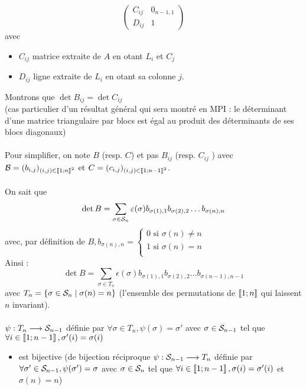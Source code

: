 \begin{dem}
\[\begin{pmatrix}
        C_{ij} & 0_{n-1,1} \\
        D_{ij} & 1         
    \end{pmatrix}\]
    avec
    \begin{itemize}
        \item \(C_{ij}\) matrice extraite de \(A\) en otant \(L_i\) et \(C_j\)
        \item \(D_{ij}\) ligne extraite de \(L_i\) en otant sa colonne \(j\).
    \end{itemize}
    Montrons que \(\det B_{ij} = \det C_{ij}\)\\
    (cas particulier d’un résultat général qui sera montré en MPI : le déterminant d’une matrice triangulaire par blocs est égal au produit des déterminants de ses blocs diagonaux)\\~\\
    Pour simplifier, on note \(B\) (resp. \(C\)) et pas \(B_{ij}\) (resp. \(C_{ij}\) ) avec \(\cal{B} = (b_{i,j} )_{(i,j) \in\interventierii{1}{n}^2}\) et \(C = (c_{i,j})_{(i,j)\in \interventierii{1}{n-1}^2}\).\\~\\
    On sait que
    \[\det B = \sum_{\sigma \in\cal{S}_n} \epsilon(\sigma )b_{\sigma (1),1}b_{\sigma (2),2} \dots b_{\sigma (n),n}\]
    avec, par définition de \(B, b_{\sigma (n),n} = 
    \begin{cases}
        0 \text{ si }\sigma (n)\neq n \\
        1 \text{ si }\sigma (n) = n\\
    \end{cases}
    \)\\
    Ainsi :
    \[\det B = \sum_{\sigma \in T_n} \epsilon(\sigma )b_{\sigma (1),1}b_{\sigma (2),2} \dots b_{\sigma (n-1),n-1}\]
    avec \(T_n = \accol{\sigma  \in \cal{S}_n \tq \sigma (n) = n}\) (\ie l’ensemble des permutations de \(\interventierii{1}{n}\) qui laissent \(n\) invariant).\\~\\
    \(\psi : T_n \to \cal{S}_{n-1}\) définie par \(\forall \sigma  \in T_n, \psi(\sigma ) = \sigma '\) avec \(\sigma  \in \cal{S}_{n-1}\) tel que \(\forall i \in \interventierii{1}{n-1} , \sigma '(i) = \sigma (i)\)
    \begin{itemize}
        \item est bijective (de bijection réciproque \(\psi : \cal{S}_{n-1} \to T_n\) définie par \(\forall \sigma ' \in \cal{S}_{n-1}, \psi(\sigma ') = \sigma\)  avec \(\sigma  \in \cal{S}_n\) tel que \(\forall i \in \interventierii{1}{n-1} , \sigma (i) = \sigma '(i)\) et \(\sigma (n) = n\))

\end{itemize}
\end{dem}

